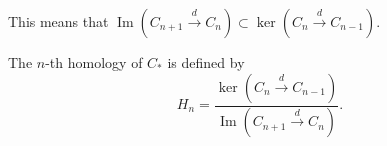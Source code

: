 This means that $\operatorname{Im} (C_{n + 1} \xrightarrow{d} C_n) \subset \operatorname{ker} (C_n \xrightarrow{d} C_{n - 1})$.

\begin{definition}[Homology]
	\label{defn:Homology}
	The $n$-th homology of $C_*$ is defined by
	\[
		H_n = \frac{\operatorname{ker} \left( C_n \xrightarrow{d} C_{n - 1} \right) }{\operatorname{Im} \left( C_{n + 1} \xrightarrow{d} C_n \right) }
	.\] 
\end{definition}







